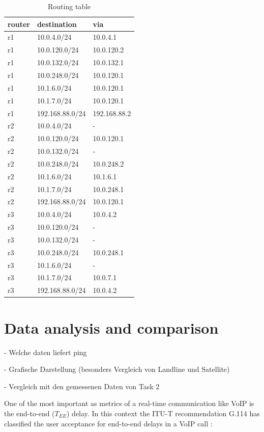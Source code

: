 \documentclass[parskip=full]{scrartcl}
\begin{document}
\begin{table}[hb]
	\centering

	\begin{tabular}{lll}
		\toprule
		\textbf{router} & \textbf{destination} & \textbf{via}  \\ \midrule
		r1 & 10.0.4.0/24 & 10.0.4.1 \\
		r1 & 10.0.120.0/24 & 10.0.120.2 \\
		r1 & 10.0.132.0/24 & 10.0.132.1 \\
		r1 & 10.0.248.0/24 & 10.0.120.1 \\
		r1 & 10.1.6.0/24 & 10.0.120.1 \\
		r1 & 10.1.7.0/24 & 10.0.120.1 \\
		r1 & 192.168.88.0/24 & 192.168.88.2\\
		\midrule
		r2 & 10.0.4.0/24 & - \\
		r2 & 10.0.120.0/24 & 10.0.120.1 \\
		r2 & 10.0.132.0/24 & - \\
		r2 & 10.0.248.0/24 & 10.0.248.2 \\
		r2 & 10.1.6.0/24 & 10.1.6.1 \\
		r2 & 10.1.7.0/24 & 10.0.248.1 \\
		r2 & 192.168.88.0/24 & 10.0.120.1\\
		\midrule
		r3 & 10.0.4.0/24 & 10.0.4.2 \\
		r3 & 10.0.120.0/24 & - \\
		r3 & 10.0.132.0/24 & - \\
		r3 & 10.0.248.0/24 & 10.0.248.1 \\
		r3 & 10.1.6.0/24 & - \\
		r3 & 10.1.7.0/24 & 10.0.7.1 \\
		r3 & 192.168.88.0/24 & 10.0.4.2\\
		\bottomrule
	\end{tabular}
	\caption{Routing table}
	\label{tab:routing}
\end{table}
\clearpage
\section{Data analysis and comparison} \label{sec:data}
- Welche daten liefert ping

- Grafische Darstellung (besonders Vergleich von Landline und Satellite)

- Vergleich mit den gemessenen Daten von Task 2

One of the most important as metrics of a real-time communication like VoIP is the end-to-end ($T_{EE}$) delay. In this context the ITU-T recommendation G.114 has classified the user acceptance for end-to-end delays in a VoIP call \cite{ITU-TRecommendationG.114}:
\end{document}
